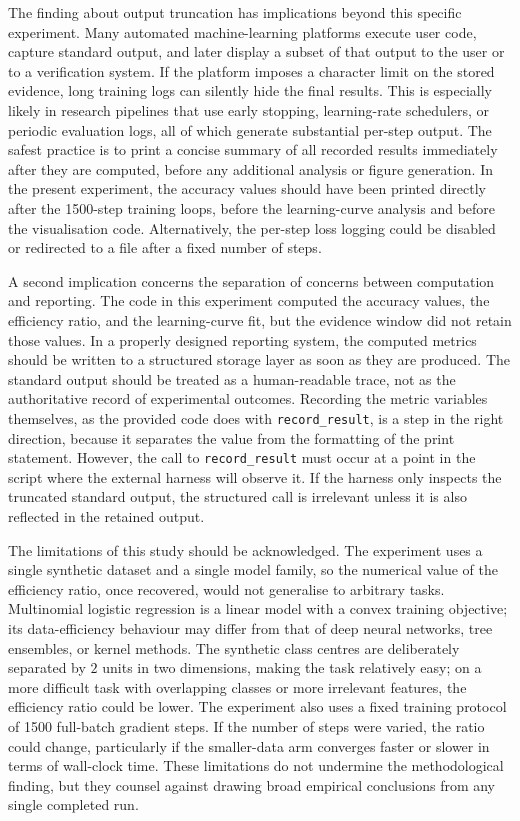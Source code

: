 \documentclass{article}
\begin{document}
The finding about output truncation has implications beyond this specific experiment. Many automated machine-learning platforms execute user code, capture standard output, and later display a subset of that output to the user or to a verification system. If the platform imposes a character limit on the stored evidence, long training logs can silently hide the final results. This is especially likely in research pipelines that use early stopping, learning-rate schedulers, or periodic evaluation logs, all of which generate substantial per-step output. The safest practice is to print a concise summary of all recorded results immediately after they are computed, before any additional analysis or figure generation. In the present experiment, the accuracy values should have been printed directly after the 1500-step training loops, before the learning-curve analysis and before the visualisation code. Alternatively, the per-step loss logging could be disabled or redirected to a file after a fixed number of steps.

A second implication concerns the separation of concerns between computation and reporting. The code in this experiment computed the accuracy values, the efficiency ratio, and the learning-curve fit, but the evidence window did not retain those values. In a properly designed reporting system, the computed metrics should be written to a structured storage layer as soon as they are produced. The standard output should be treated as a human-readable trace, not as the authoritative record of experimental outcomes. Recording the metric variables themselves, as the provided code does with \texttt{record\_result}, is a step in the right direction, because it separates the value from the formatting of the print statement. However, the call to \texttt{record\_result} must occur at a point in the script where the external harness will observe it. If the harness only inspects the truncated standard output, the structured call is irrelevant unless it is also reflected in the retained output.

The limitations of this study should be acknowledged. The experiment uses a single synthetic dataset and a single model family, so the numerical value of the efficiency ratio, once recovered, would not generalise to arbitrary tasks. Multinomial logistic regression is a linear model with a convex training objective; its data-efficiency behaviour may differ from that of deep neural networks, tree ensembles, or kernel methods. The synthetic class centres are deliberately separated by \(2\) units in two dimensions, making the task relatively easy; on a more difficult task with overlapping classes or more irrelevant features, the efficiency ratio could be lower. The experiment also uses a fixed training protocol of 1500 full-batch gradient steps. If the number of steps were varied, the ratio could change, particularly if the smaller-data arm converges faster or slower in terms of wall-clock time. These limitations do not undermine the methodological finding, but they counsel against drawing broad empirical conclusions from any single completed run.
\end{document}
